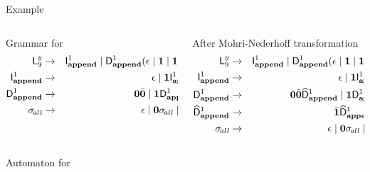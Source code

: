 \documentclass[xcolor=x11names,compress,mathserif]{beamer}
\renewcommand{\(}{\begin{columns}}
\renewcommand{\)}{\end{columns}}
\newcommand{\<}[1]{\begin{column}{#1}}
\renewcommand{\>}{\end{column}}
\begin{document}
\begin{frame}{Example}
  \scriptsize
  \begin{columns}[c]
    \begin{column}[T]{.5\textwidth}
      {Grammar for }
      \begin{eqnarray*}
        \mathsf{L}_{{9}}^{y}  &\rightarrow&  {\mathsf{I}_{\mathit {\mathbf{append}}}^{1}} \mid  {\ensuremath{\mathsf{D}_{\mathit {\mathbf{append}}}^{1}}}        (\epsilon         \mid        \mathbf{1}   \mid
        \mathbf{1}\mathbf{0} {\sigma_{\mathit{\!all}}})\\
        \mathsf{I}_{\mathit {\mathbf{append}}}^{1}    &\rightarrow&    \epsilon   \mid
        \mathbf{1}{\mathsf{I}_{\mathit {\mathbf{append}}}^{1}}\\         
        \mathsf{D}_{\mathit {\mathbf{append}}}^{1}
        &\rightarrow&               \mathbf{0}\bar{\mathbf{0}}               \mid
        \mathbf{1}\mathsf{D}_{\mathit {\mathbf{append}}}^{1}\bar{\mathbf{1}}\\
        \sigma_{\mathit{\!all}} &\rightarrow & \epsilon \mid \mathbf{0}
        \sigma_{\mathit{\!all}} \mid \mathbf{1}
        \sigma_{\mathit{\!all}}
      \end{eqnarray*}
    \end{column}
    \begin{column}[T]{.5\textwidth}
      After Mohri-Nederhoff transformation
      \begin{eqnarray*}
        \mathsf{L}_{{9}}^{y}  &\rightarrow&  {\mathsf{I}_{\mathit {\mathbf{append}}}^{1}} \mid  {\ensuremath{\mathsf{D}_{\mathit {\mathbf{append}}}^{1}}}        (\epsilon         \mid        \mathbf{1}   \mid
        \mathbf{1}\mathbf{0} {\sigma_{\mathit{\!all}}})\\
        \mathsf{I}_{\mathit {\mathbf{append}}}^{1}    &\rightarrow&    \epsilon   \mid
        \mathbf{1}{\mathsf{I}_{\mathit {\mathbf{append}}}^{1}}\\   
        \mathsf{D}_{\mathit {\mathbf{append}}}^{1}
        &\rightarrow&               \mathbf{0}\bar{\mathbf{0}} \widehat{\mathsf{D}}_{\mathit {\mathbf{append}}}^{1}  \mid
        \mathbf{1}\mathsf{D}_{\mathit {\mathbf{append}}}^{1} \\ 
                {\widehat{\mathsf{D}}_{\mathit {\mathbf{append}}}^{1}}  &\rightarrow&   \bar{\mathbf{1}}{\widehat{\mathsf{D}}_{\mathit {\mathbf{append}}}^{1}}
                \mid \epsilon \\
                \sigma_{\mathit{\!all}} &\rightarrow & \epsilon \mid \mathbf{0}
                \sigma_{\mathit{\!all}} \mid \mathbf{1}
                \sigma_{\mathit{\!all}}
      \end{eqnarray*}
    \end{column}
  \end{columns}
\end{frame}
\begin{frame}{Automaton for }

\end{frame}
\end{document}
